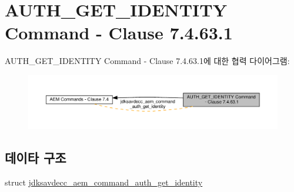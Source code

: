 \hypertarget{group__command__auth__get__identity}{}\section{A\+U\+T\+H\+\_\+\+G\+E\+T\+\_\+\+I\+D\+E\+N\+T\+I\+TY Command -\/ Clause 7.4.63.1}
\label{group__command__auth__get__identity}
A\+U\+T\+H\+\_\+\+G\+E\+T\+\_\+\+I\+D\+E\+N\+T\+I\+TY Command -\/ Clause 7.4.63.1에 대한 협력 다이어그램\+:
\nopagebreak
\begin{figure}[H]
\begin{center}
\leavevmode
\includegraphics[width=350pt]{group__command__auth__get__identity}
\end{center}
\end{figure}
\subsection*{데이타 구조}
\begin{DoxyCompactItemize}
\item 
struct \hyperlink{structjdksavdecc__aem__command__auth__get__identity}{jdksavdecc\+\_\+aem\+\_\+command\+\_\+auth\+\_\+get\+\_\+identity}
\end{DoxyCompactItemize}
